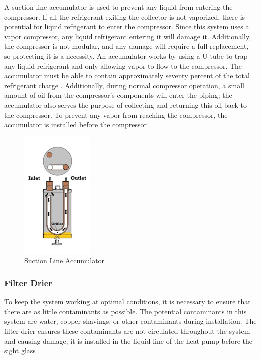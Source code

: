 A suction line accumulator is used to prevent any liquid from entering the compressor. If all the refrigerant exiting the collector is not vaporized, there is potential for liquid refrigerant to enter the compressor. Since this system uses a vapor compressor, any liquid refrigerant entering it will damage it. Additionally, the compressor is not modular, and any damage will require a full replacement, so protecting it is a necessity. An accumulator works by using a U-tube to trap any liquid refrigerant and only allowing vapor to flow to the compressor. The accumulator must be able to contain approximately seventy percent of the total refrigerant charge \cite{sporlan}. Additionally, during normal compressor operation, a small amount of oil from the compressor’s components will enter the piping; the accumulator also serves the purpose of collecting and returning this oil back to the compressor. To prevent any vapor from reaching the compressor, the accumulator is installed before the compressor \cite{accumulator}.

\medskip
\begin{figure}[H]
    \centering
    \includegraphics[width=3.5cm]{images/accumulator.jpg}
    \caption{Suction Line Accumulator \cite{accumulator_basics}}
\end{figure}

\subsubsection{Filter Drier}

To keep the system working at optimal conditions, it is necessary to ensure that there are as little contaminants as possible. The potential contaminants in this system are water, copper shavings, or other contaminants during installation. The filter drier ensures these contaminants are not circulated throughout the system and causing damage; it is installed in the liquid-line of the heat pump before the sight glass \cite{sight_glass}.

